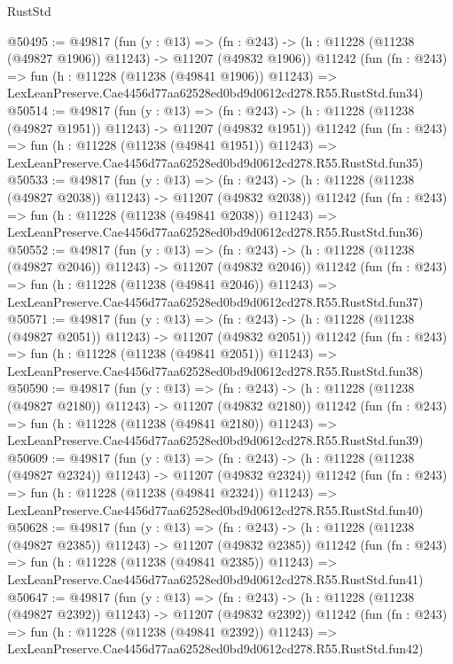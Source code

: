 \begin{lexlean}{RustStd}
\begin{coremodule}
@50495 := @49817
    (fun (y : @13) =>
    (fn : @243) -> (h : @11228 (@11238 (@49827 @1906)) @11243) -> @11207 (@49832 @1906))
    @11242
    (fun (fn : @243) =>
    fun (h : @11228 (@11238 (@49841 @1906)) @11243) =>
    LexLeanPreserve.Cae4456d77aa62528ed0bd9d0612cd278.R55.RustStd.fun34)
@50514 := @49817
    (fun (y : @13) =>
    (fn : @243) -> (h : @11228 (@11238 (@49827 @1951)) @11243) -> @11207 (@49832 @1951))
    @11242
    (fun (fn : @243) =>
    fun (h : @11228 (@11238 (@49841 @1951)) @11243) =>
    LexLeanPreserve.Cae4456d77aa62528ed0bd9d0612cd278.R55.RustStd.fun35)
@50533 := @49817
    (fun (y : @13) =>
    (fn : @243) -> (h : @11228 (@11238 (@49827 @2038)) @11243) -> @11207 (@49832 @2038))
    @11242
    (fun (fn : @243) =>
    fun (h : @11228 (@11238 (@49841 @2038)) @11243) =>
    LexLeanPreserve.Cae4456d77aa62528ed0bd9d0612cd278.R55.RustStd.fun36)
@50552 := @49817
    (fun (y : @13) =>
    (fn : @243) -> (h : @11228 (@11238 (@49827 @2046)) @11243) -> @11207 (@49832 @2046))
    @11242
    (fun (fn : @243) =>
    fun (h : @11228 (@11238 (@49841 @2046)) @11243) =>
    LexLeanPreserve.Cae4456d77aa62528ed0bd9d0612cd278.R55.RustStd.fun37)
@50571 := @49817
    (fun (y : @13) =>
    (fn : @243) -> (h : @11228 (@11238 (@49827 @2051)) @11243) -> @11207 (@49832 @2051))
    @11242
    (fun (fn : @243) =>
    fun (h : @11228 (@11238 (@49841 @2051)) @11243) =>
    LexLeanPreserve.Cae4456d77aa62528ed0bd9d0612cd278.R55.RustStd.fun38)
@50590 := @49817
    (fun (y : @13) =>
    (fn : @243) -> (h : @11228 (@11238 (@49827 @2180)) @11243) -> @11207 (@49832 @2180))
    @11242
    (fun (fn : @243) =>
    fun (h : @11228 (@11238 (@49841 @2180)) @11243) =>
    LexLeanPreserve.Cae4456d77aa62528ed0bd9d0612cd278.R55.RustStd.fun39)
@50609 := @49817
    (fun (y : @13) =>
    (fn : @243) -> (h : @11228 (@11238 (@49827 @2324)) @11243) -> @11207 (@49832 @2324))
    @11242
    (fun (fn : @243) =>
    fun (h : @11228 (@11238 (@49841 @2324)) @11243) =>
    LexLeanPreserve.Cae4456d77aa62528ed0bd9d0612cd278.R55.RustStd.fun40)
@50628 := @49817
    (fun (y : @13) =>
    (fn : @243) -> (h : @11228 (@11238 (@49827 @2385)) @11243) -> @11207 (@49832 @2385))
    @11242
    (fun (fn : @243) =>
    fun (h : @11228 (@11238 (@49841 @2385)) @11243) =>
    LexLeanPreserve.Cae4456d77aa62528ed0bd9d0612cd278.R55.RustStd.fun41)
@50647 := @49817
    (fun (y : @13) =>
    (fn : @243) -> (h : @11228 (@11238 (@49827 @2392)) @11243) -> @11207 (@49832 @2392))
    @11242
    (fun (fn : @243) =>
    fun (h : @11228 (@11238 (@49841 @2392)) @11243) =>
    LexLeanPreserve.Cae4456d77aa62528ed0bd9d0612cd278.R55.RustStd.fun42)

\end{coremodule}
\end{lexlean}
